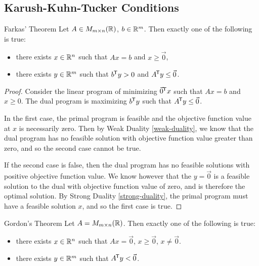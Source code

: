 \subsection{Karush-Kuhn-Tucker Conditions}

\begin{thm}{Farkas' Theorem}\label{farkas}\proofbreak
    Let $A \in M_{m \times n}(\mathbb{R})$, $b \in \mathbb{R}^m$. Then exactly one of the following is true:
    \begin{itemize}
        \item there exists $x \in \mathbb{R}^n$ such that $Ax = b$ and $x \geq \vec{0}$,
        \item there exists $y \in \mathbb{R}^m$ such that ${b}^{\mkern-1.5mu\mathsf{T}}y > 0$ and ${A}^{\mkern-1.5mu\mathsf{T}}y \leq \vec{0}$.
    \end{itemize}
\end{thm}

\begin{proof}
    Consider the linear program of minimizing ${\vec{0}}^{\mkern-1.5mu\mathsf{T}}x$ such that $Ax = b$ and $x \geq {0}$. The dual program is maximizing ${b}^{\mkern-1.5mu\mathsf{T}}y$ such that ${A}^{\mkern-1.5mu\mathsf{T}}y \leq \vec{0}$.

    In the first case, the primal program is feasible and the objective function value at $x$ is necessarily zero. Then by Weak Duality \ref{weak-duality}, we know that the dual program has no feasible solution with objective function value greater than zero, and so the second case cannot be true.

    If the second case is false, then the dual program has no feasible solutions with positive objective function value. We know however that the $y = \vec{0}$ is a feasible solution to the dual with objective function value of zero, and is therefore the optimal solution. By Strong Duality \ref{strong-duality}, the primal program must have a feasible solution $x$, and so the first case is true.
\end{proof}

\begin{thm}{Gordon's Theorem}\label{gordons}\proofbreak
    Let $A = M_{m \times n}(\mathbb{R})$. Then exactly one of the following is true:
    \begin{itemize}
        \item there exists $x \in \mathbb{R}^n$ such that $Ax = \vec{0}$, $x \geq \vec{0}$, $x \neq \vec{0}$.
        \item there exists $y \in \mathbb{R}^m$ such that ${A}^{\mkern-1.5mu\mathsf{T}}y < \vec{0}$.
    \end{itemize}
\end{thm}

